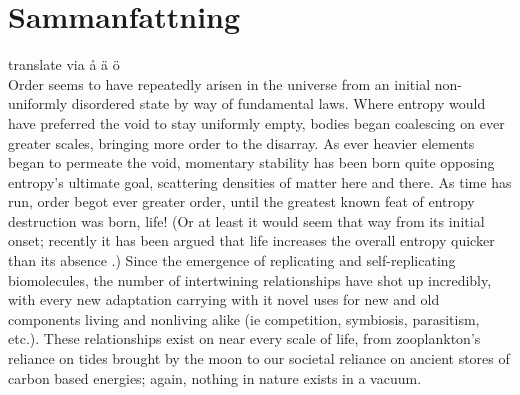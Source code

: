 


\chapter{Sammanfattning}
translate via
\r{a} \"a \"o \\

Order seems to have repeatedly arisen in the universe from an initial non-uniformly disordered state by way of fundamental laws.%
Where entropy would have preferred the void to stay uniformly empty, bodies began coalescing on ever greater scales, bringing more order to the disarray.%
As ever heavier elements began to permeate the void, momentary stability has been born quite opposing entropy's ultimate goal, scattering densities of matter here and there. As time has run, order begot ever greater order, until the greatest known feat of entropy destruction was born, life! (Or at least it would seem that way from its initial onset; recently it has been argued that life increases the overall entropy quicker than its absence \citep{england2013statistical}.) Since the emergence of replicating and self-replicating biomolecules, the number of intertwining relationships have shot up incredibly, with every new adaptation carrying with it novel uses for new and old components living and nonliving alike  (ie competition, symbiosis, parasitism, etc.). These relationships exist on near every scale of life, from zooplankton's reliance on tides brought by the moon to our societal reliance on ancient stores of carbon based energies; again, nothing in nature exists in a vacuum.

